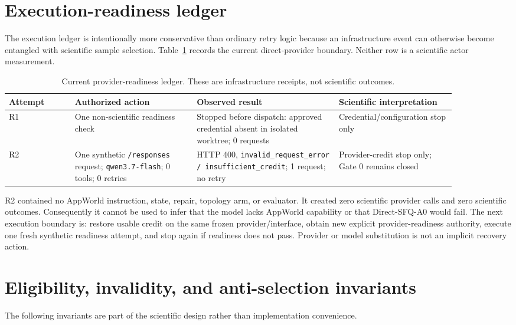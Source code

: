 \documentclass{article}
\begin{document}
\clearpage
\appendix

\section{Execution-readiness ledger}
\label{app:readiness}
The execution ledger is intentionally more conservative than ordinary retry logic because an infrastructure event can otherwise become entangled with scientific sample selection. Table~\ref{tab:readiness-ledger} records the current direct-provider boundary. Neither row is a scientific actor measurement.

\begin{table}[h]
\centering
\caption{Current provider-readiness ledger. These are infrastructure receipts, not scientific outcomes.}
\label{tab:readiness-ledger}
\small
\begin{tabular}{p{0.13\linewidth}p{0.24\linewidth}p{0.28\linewidth}p{0.23\linewidth}}
\toprule
Attempt & Authorized action & Observed result & Scientific interpretation \\
\midrule
R1 & One non-scientific readiness check & Stopped before dispatch: approved credential absent in isolated worktree; 0 requests & Credential/configuration stop only \\
R2 & One synthetic \texttt{/responses} request; \texttt{qwen3.7-flash}; 0 tools; 0 retries & HTTP 400, \texttt{invalid\_request\_error / insufficient\_credit}; 1 request; no retry & Provider-credit stop only; Gate 0 remains closed \\
\bottomrule
\end{tabular}
\end{table}

R2 contained no AppWorld instruction, state, repair, topology arm, or evaluator. It created zero scientific provider calls and zero scientific outcomes. Consequently it cannot be used to infer that the model lacks AppWorld capability or that Direct-SFQ-A0 would fail. The next execution boundary is: restore usable credit on the same frozen provider/interface, obtain new explicit provider-readiness authority, execute one fresh synthetic readiness attempt, and stop again if readiness does not pass. Provider or model substitution is not an implicit recovery action.

\section{Eligibility, invalidity, and anti-selection invariants}
\label{app:invariants}
The following invariants are part of the scientific design rather than implementation convenience.
\end{document}
